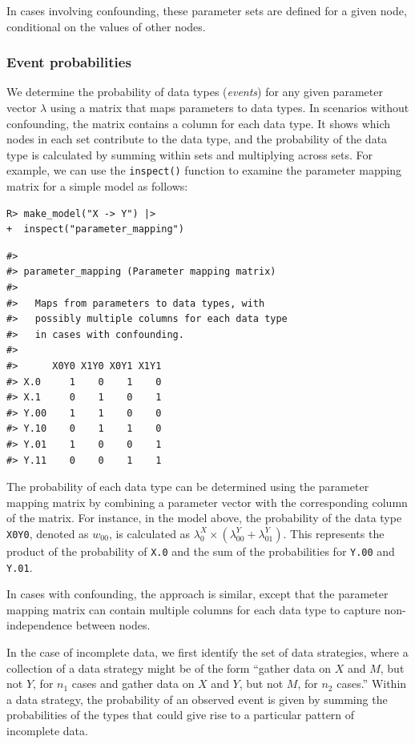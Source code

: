 \documentclass[
  11pt,
  article]{jss}
\begin{document}
In cases involving confounding, these parameter sets are defined for a
given node, conditional on the values of other nodes.

\subsubsection{Event probabilities}\label{event-probabilities}

We determine the probability of data types (\emph{events}) for any given
parameter vector \(\lambda\) using a matrix that maps parameters to data
types. In scenarios without confounding, the matrix contains a column
for each data type. It shows which nodes in each set contribute to the
data type, and the probability of the data type is calculated by summing
within sets and multiplying across sets. For example, we can use the
\texttt{inspect()} function to examine the parameter mapping matrix for
a simple model as follows:

\begin{verbatim}
R> make_model("X -> Y") |> 
+  inspect("parameter_mapping") 
\end{verbatim}

\begin{verbatim}
#> 
#> parameter_mapping (Parameter mapping matrix) 
#> 
#>   Maps from parameters to data types, with
#>   possibly multiple columns for each data type
#>   in cases with confounding. 
#> 
#>      X0Y0 X1Y0 X0Y1 X1Y1
#> X.0     1    0    1    0
#> X.1     0    1    0    1
#> Y.00    1    1    0    0
#> Y.10    0    1    1    0
#> Y.01    1    0    0    1
#> Y.11    0    0    1    1
\end{verbatim}

The probability of each data type can be determined using the parameter
mapping matrix by combining a parameter vector with the corresponding
column of the matrix. For instance, in the model above, the probability
of the data type \texttt{X0Y0}, denoted as \(w_{00}\), is calculated as
\(\lambda^X_0 \times (\lambda^Y_{00} + \lambda^Y_{01})\). This
represents the product of the probability of \texttt{X.0} and the sum of
the probabilities for \texttt{Y.00} and \texttt{Y.01}.

In cases with confounding, the approach is similar, except that the
parameter mapping matrix can contain multiple columns for each data type
to capture non-independence between nodes.

In the case of incomplete data, we first identify the set of data
strategies, where a collection of a data strategy might be of the form
``gather data on \(X\) and \(M\), but not \(Y\), for \(n_1\) cases and
gather data on \(X\) and \(Y\), but not \(M\), for \(n_2\) cases.''
Within a data strategy, the probability of an observed event is given by
summing the probabilities of the types that could give rise to a
particular pattern of incomplete data.
\end{document}

